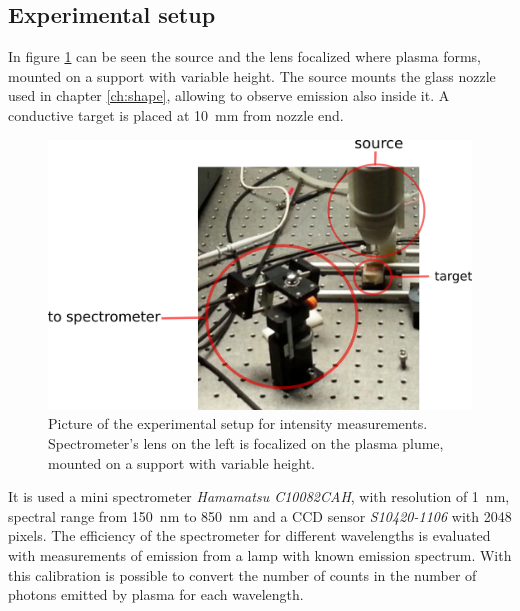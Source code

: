 \subsection{Experimental setup}
In figure \ref{fig:app2} can be seen the source and the lens focalized where plasma forms, mounted on a support with variable height. The source mounts the glass nozzle used in chapter \ref{ch:shape}, allowing to observe emission also inside it. A conductive target is placed at \SI{10}{\milli\meter} from nozzle end.
\begin{figure}
\centering
\includegraphics[width=.7\textwidth]{Images/Spectroscopy/app2_lines.png}
\caption{Picture of the experimental setup for intensity measurements. Spectrometer's lens on the left is focalized on the plasma plume, mounted on a support with variable height.}
\label{fig:app2}
\end{figure}

It is used a mini spectrometer \emph{Hamamatsu C10082CAH}, with resolution of \SI{1}{\nano\meter}, spectral range from \SI{150}{\nano\meter} to \SI{850}{\nano\meter} and a CCD sensor \emph{S10420-1106} with \num{2048} pixels. The efficiency of the spectrometer for different wavelengths is evaluated with measurements of emission from a lamp with known emission spectrum. With this calibration is possible to convert the number of counts in the number of photons emitted by plasma for each wavelength.

